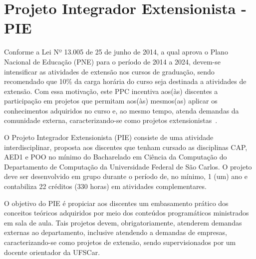 \documentclass[11pt,a4paper]{report}
\begin{document}

\tableofcontents
\listoffigures
\listoftables

%






%
%
%
%
%
%
%
%
%
%
%








\appendix

\chapter{Projeto Integrador Extensionista - PIE}\label{anexo: PIE} 

Conforme a Lei Nº 13.005 de 25 de junho de 2014, a qual aprova o Plano Nacional de Educação (PNE) para o período de 2014 a 2024, devem-se intensificar as atividades de extensão nos cursos de graduação, sendo recomendado que 10\% da carga horária do curso seja destinada a atividades de extensão. Com essa motivação, este PPC incentiva aos(às) discentes a participação em projetos que permitam aos(às) mesmos(as) aplicar os conhecimentos adquiridos no curso e, ao mesmo tempo, atenda demandas da comunidade externa, caracterizando-se como projetos extensionistas~\cite{SENAC}.

O Projeto Integrador Extensionista (PIE) consiste de uma atividade interdisciplinar, proposta aos discentes que tenham cursado as disciplinas CAP, AED1 e POO no mínimo do Bacharelado em Ciência da Computação do Departamento de Computação da Universidade Federal de São Carlos. O projeto deve ser desenvolvido em grupo durante o período de, no mínimo, 1 (um) ano e contabiliza 22 créditos (330 horas) em atividades complementares.

O objetivo do PIE é propiciar aos discentes um embasamento prático dos conceitos teóricos adquiridos por meio dos conteúdos programáticos ministrados em sala de aula.  Tais projetos devem, obrigatoriamente, atenderem demandas externas ao departamento, inclusive atendendo a demandas de empresas, caracterizando-se como projetos de extensão, sendo supervisionados por um docente orientador da UFSCar.
\end{document}
